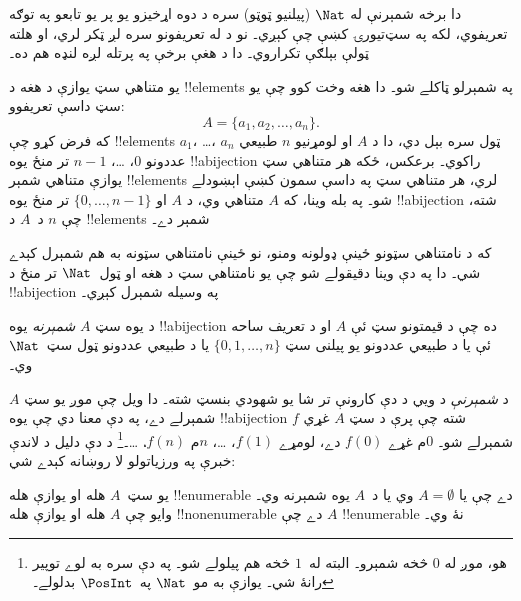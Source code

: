 \documentclass[../../../include/open-logic-section]{subfiles}
\begin{document}


\begin{editorial}
  دا برخه شمېرنې له $\Nat$ (پيلنيو ټوټو) سره د دوه اړخيزو يو
  پر يو تابعو په توګه تعريفوي، لکه په سټ‌تيورۍ کښې چې کېږي۔ نو
  د  له تعريفونو سره لږ ټکر لري، او هلته ټولې
  بېلګې تکراروي۔ دا د هغې برخې په پرتله لږه لنډه هم ده۔
\end{editorial}

يو متناهي سټ يوازې د هغه د !!{element}s په شمېرلو ټاکلے شو۔ دا
هغه وخت کوو چې يو سټ داسې تعريفوو:
\[
  A = \{a_1, a_2, \ldots, a_n\}.
\]
که فرض کړو چې !!{element}s $a_1$، \dots، $a_n$ ټول سره بېل دي،
دا د $A$ او لومړنيو $n$ طبيعي عددونو $0$، \dots، $n-1$ تر منځ
يوه !!a{bijection} راکوي۔ برعکس، ځکه هر متناهي سټ يوازې متناهي
شمېر !!{element}s لري، هر متناهي سټ په داسې سمون کښې اېښودلے
شو۔ په بله وينا، که $A$ متناهي وي، د $A$ او
$\{0, \dots, n-1\}$ تر منځ يوه !!a{bijection} شته، چې $n$ د~$A$
د !!{element}s شمېر دے۔

که د نامتناهي سټونو ځينې ډولونه ومنو، نو ځينې نامتناهي سټونه به
هم شمېرل کېدے شي۔ دا په دې وينا دقيقولے شو چې يو نامتناهي سټ د
هغه او ټول~$\Nat$ تر منځ د !!a{bijection} په وسيله شمېرل کېږي۔

\begin{defn}
د يوه سټ $A$ \emph{شمېرنه} يوه !!a{bijection} ده چې د قيمتونو
سټ ئې $A$ او د تعريف ساحه ئې يا د طبيعي عددونو يو پيلنی سټ
$\{0, 1, \ldots, n\}$ {يا} د طبيعي عددونو ټول سټ~$\Nat$ وي۔
\end{defn}

\begin{explain}
د \emph{شمېرنې} د ويي د دې کارونې تر شا يو شهودي بنسټ شته۔ دا
ويل چې موږ يو سټ $A$ شمېرلے دے، په دې معنا دي چې يوه
!!a{bijection} $f$ شته چې پرې د سټ $A$ غړي شمېرلے شو۔ $0$م غړے
$f(0)$ دے، لومړے $f(1)$، \ldots، $n$م $f(n)$،
\ldots۔\footnote{هو، موږ له $0$ څخه شمېرو۔ البته له~$1$ څخه هم
پيلولے شو۔ په دې سره به لوے توپير رانۀ شي۔ يوازې به مو~$\Nat$
په~$\PosInt$ بدلولے۔} د دې دليل د لاندې خبرې په ورزياتولو لا
روښانه کېدے شي:
\end{explain}

\begin{defn}
  يو سټ~$A$ هله او يوازې هله !!{enumerable} دے چې يا
  $A = \emptyset$ وي يا د~$A$ يوه شمېرنه وي۔ وايو چې $A$ هله
  او يوازې هله !!{nonenumerable} دے چې $A$ !!{enumerable} نۀ وي۔
\end{defn}
\end{document}
